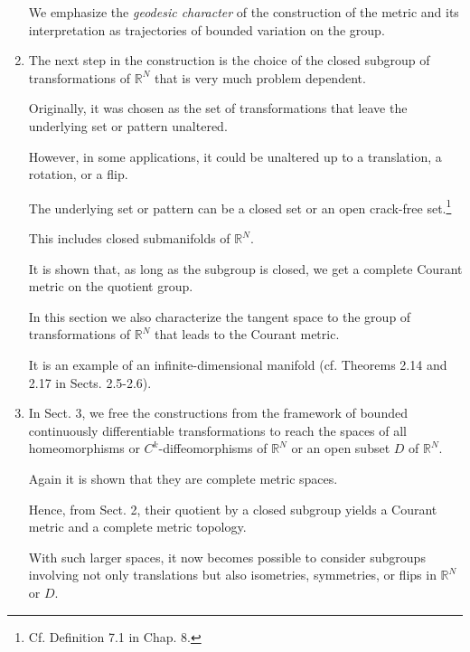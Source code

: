 \documentclass{book}
\numberwithin{equation}{section}
\begin{document}
\begin{enumerate}
    We emphasize the \textit{geodesic character} of the construction of the metric and its interpretation as trajectories of bounded variation on the group.
    \item The next step in the construction is the choice of the closed subgroup of transformations of $\mathbb{R}^N$ that is very much problem dependent.
    
    Originally, it was chosen as the set of transformations that leave the underlying set or pattern unaltered.
    
    However, in some applications, it could be unaltered up to a translation, a rotation, or a flip.
    
    The underlying set or pattern can be a closed set or an open crack-free set.\footnote{Cf. Definition 7.1 in Chap. 8.}
    
    This includes closed submanifolds of $\mathbb{R}^N$.
    
    It is shown that, as long as the subgroup is closed, we get a complete Courant metric on the quotient group.
    
    In this section we also characterize the tangent space to the group of transformations of $\mathbb{R}^N$ that leads to the Courant metric.
    
    It is an example of an infinite-dimensional manifold (cf. Theorems 2.14 and 2.17 in Sects. 2.5-2.6).
    \item In Sect. 3, we free the constructions from the framework of bounded continuously differentiable transformations to reach the spaces of all homeomorphisms or $C^k$-diffeomorphisms of $\mathbb{R}^N$ or an open subset $D$ of $\mathbb{R}^N$.
    
    Again it is shown that they are complete metric spaces.
    
    Hence, from Sect. 2, their quotient by a closed subgroup yields a Courant metric and a complete metric topology.
    
    With such larger spaces, it now becomes possible to consider subgroups involving not only translations but also isometries, symmetries, or flips in $\mathbb{R}^N$ or $D$.
\end{enumerate}
\end{document}

